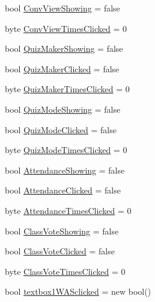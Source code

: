 \begin{DoxyCompactItemize}
\item 
bool \hyperlink{class_sr_p___classroom_inq_1_1frm_classrrom_inq_a5b2fbbaa361339e096aa4be3f8e2b2dd}{\-Conv\-View\-Showing} = false
\item 
byte \hyperlink{class_sr_p___classroom_inq_1_1frm_classrrom_inq_a8b7285b1ee1626d8ebdc99d4bd6046a8}{\-Conv\-View\-Times\-Clicked} = 0
\item 
bool \hyperlink{class_sr_p___classroom_inq_1_1frm_classrrom_inq_a527e6e32ab67073ccbdb94297399ab2d}{\-Quiz\-Maker\-Showing} = false
\item 
bool \hyperlink{class_sr_p___classroom_inq_1_1frm_classrrom_inq_a80b43512315939f073e08cfea00ce796}{\-Quiz\-Maker\-Clicked} = false
\item 
byte \hyperlink{class_sr_p___classroom_inq_1_1frm_classrrom_inq_ae28b52f195f8e33470bb7bbc988ba622}{\-Quiz\-Maker\-Times\-Clicked} = 0
\item 
bool \hyperlink{class_sr_p___classroom_inq_1_1frm_classrrom_inq_a2be9d2ea6cc1cabf0dc6c6f3ee2544ce}{\-Quiz\-Mode\-Showing} = false
\item 
bool \hyperlink{class_sr_p___classroom_inq_1_1frm_classrrom_inq_af09c14bf56f313348d1e4a533fe515bf}{\-Quiz\-Mode\-Clicked} = false
\item 
byte \hyperlink{class_sr_p___classroom_inq_1_1frm_classrrom_inq_a0c88b881dc5ae86b5b3d5e04434b2ea8}{\-Quiz\-Mode\-Times\-Clicked} = 0
\item 
bool \hyperlink{class_sr_p___classroom_inq_1_1frm_classrrom_inq_a24415681575df1fd435d1b1da60dfde3}{\-Attendance\-Showing} = false
\item 
bool \hyperlink{class_sr_p___classroom_inq_1_1frm_classrrom_inq_a319172bf9b9e58ec37499658a5289284}{\-Attendance\-Clicked} = false
\item 
byte \hyperlink{class_sr_p___classroom_inq_1_1frm_classrrom_inq_ade18c1a241b76944c2731681e1767652}{\-Attendance\-Times\-Clicked} = 0
\item 
bool \hyperlink{class_sr_p___classroom_inq_1_1frm_classrrom_inq_ae23aa3324c19688aa8d35b0217cf9605}{\-Class\-Vote\-Showing} = false
\item 
bool \hyperlink{class_sr_p___classroom_inq_1_1frm_classrrom_inq_a1e2c8341b4d2988c61648bea9a4c412b}{\-Class\-Vote\-Clicked} = false
\item 
byte \hyperlink{class_sr_p___classroom_inq_1_1frm_classrrom_inq_ab63c943c019363dba6aa86686b9f2bf6}{\-Class\-Vote\-Times\-Clicked} = 0
\item 
bool \hyperlink{class_sr_p___classroom_inq_1_1frm_classrrom_inq_a998e499144884577e3445f4b721b4c6a}{textbox1\-W\-A\-Sclicked} = new bool()

\end{DoxyCompactItemize}
